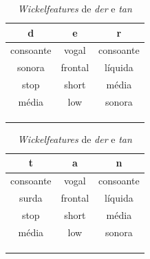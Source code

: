 \begin{table}[!htb]
    \begin{minipage}{.5\linewidth}
      \centering
      \caption{}
        \begin{tabular}{ccc}
        d                    & e                    & r                    \\ \hline
        consoante            & vogal                & consoante            \\
        sonora               & frontal              & líquida              \\
        stop                 & short                & média                \\
        média               & low                  & sonora               \\
        \multicolumn{1}{l}{} & \multicolumn{1}{l}{} & \multicolumn{1}{l}{} \\
        \multicolumn{1}{l}{} & \multicolumn{1}{l}{} & \multicolumn{1}{l}{} \\
        \multicolumn{1}{l}{} & \multicolumn{1}{l}{} & \multicolumn{1}{l}{}
        \end{tabular}
        \label{tab:der}
    \end{minipage}%
    \begin{minipage}{.5\linewidth}
      \centering
        \caption{}

    \begin{tabular}{ccc}
    t                    & a                    & n                    \\ \hline
    consoante            & vogal                & consoante            \\
    surda                & frontal              & líquida              \\
    stop                 & short                & média                \\
    média                & low                  & sonora               \\
    \multicolumn{1}{l}{} & \multicolumn{1}{l}{} & \multicolumn{1}{l}{} \\
    \multicolumn{1}{l}{} & \multicolumn{1}{l}{} & \multicolumn{1}{l}{} \\
    \multicolumn{1}{l}{} & \multicolumn{1}{l}{} & \multicolumn{1}{l}{}
    \end{tabular}
    \label{tab:tan}
    \end{minipage} 
\caption{\textit{Wickelfeatures} de \textit{der} e \textit{tan}}
\label{tab:wickeldertan}
\end{table}


